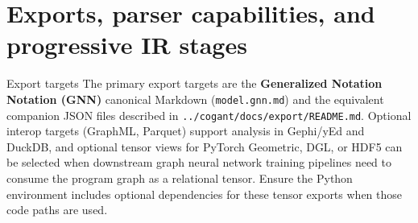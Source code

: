 \documentclass[
  ignorenonframetext,
]{beamer}
\author{\texorpdfstring{}{}}
\date{}
\begin{document}
\section{Exports, parser capabilities, and progressive IR
stages}\label{exports-parser-capabilities-and-progressive-ir-stages}

\begin{frame}[fragile]{Export targets}
\protect{}\label{export-targets}
The primary export targets are the \textbf{Generalized Notation Notation
(GNN)} canonical Markdown (\texttt{model.gnn.md}) and the equivalent
companion JSON files described in
\texttt{../cogant/docs/export/README.md}. Optional interop targets
(GraphML, Parquet) support analysis in Gephi/yEd and DuckDB, and
optional tensor views for PyTorch Geometric, DGL, or HDF5 can be
selected when downstream graph neural network training pipelines need to
consume the program graph as a relational tensor. Ensure the Python
environment includes optional dependencies for these tensor exports when
those code paths are used.
\end{frame}
\end{document}

